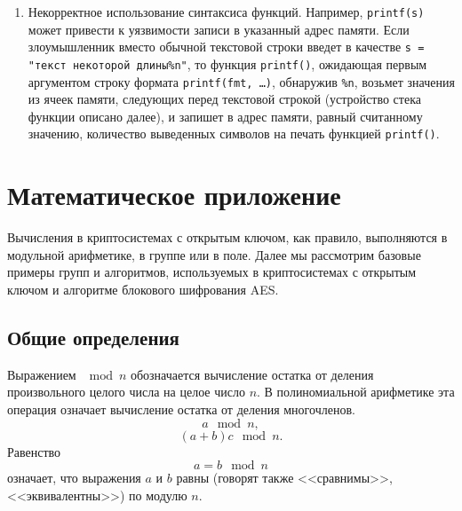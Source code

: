 \documentclass[10pt,a4paper]{book}
\begin{document}
\begin{enumerate}
\begin{enumerate}
        \end{enumerate}
    \item Некорректное использование синтаксиса функций. Например, \texttt{printf(s)} может привести к уязвимости записи в указанный адрес памяти. Если злоумышленник вместо обычной текстовой строки введет в качестве \texttt{s = "текст некоторой длины\%n"}, то функция \texttt{printf()}, ожидающая первым аргументом строку формата \texttt{printf(fmt, \dots)}, обнаружив \texttt{\%n}, возьмет значения из ячеек памяти, следующих перед текстовой строкой (устройство стека функции описано далее), и запишет в адрес памяти, равный считанному значению, количество выведенных символов на печать функцией \texttt{printf()}.
\end{enumerate}










\appendix

\chapter{Математическое приложение}
\label{chap:discrete-math}

Вычисления в криптосистемах с открытым ключом, как правило, выполняются в модульной арифметике, в группе или в поле. Далее мы рассмотрим базовые примеры групп и алгоритмов, используемых в криптосистемах с открытым ключом и алгоритме блокового шифрования AES.

\section*{Общие определения}

Выражением $\mod n$ обозначается вычисление остатка от деления произвольного целого числа на целое число $n$. В полиномиальной арифметике эта операция означает вычисление остатка от деления многочленов.
    \[ a\mod n, \]
    \[ (a + b) c\mod n. \]
Равенство
    \[ a = b \mod n \]
означает, что выражения $a$ и $b$ равны (говорят также <<сравнимы>>, <<эквивалентны>>) по модулю $n$.
\end{document}
